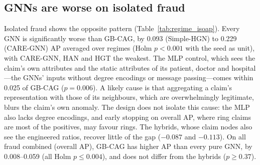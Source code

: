 \documentclass[pdflatex,sn-vancouver-num]{sn-jnl}
\begin{document}
\subsection{GNNs are worse on isolated fraud}
Isolated fraud shows the opposite pattern (Table~\ref{tab:regime_isoap}).
Every GNN is significantly worse than GB-CAG, by 0.093 (Simple-HGN) to 0.229
(CARE-GNN) AP averaged over regimes (Holm $p<0.001$ with the seed as unit),
with CARE-GNN, HAN and HGT the weakest. The MLP control, which sees the claim's own
attributes and the static attributes of its patient, doctor and
hospital---the GNNs' inputs without degree encodings or message
passing---comes within 0.025 of GB-CAG ($p=0.006$). A likely cause is that
aggregating a claim's representation with those of its neighbours, which are
overwhelmingly legitimate, blurs the claim's own anomaly. The design does not
isolate this cause: the MLP also lacks degree encodings, and early stopping on
overall AP, where ring claims are most of the positives, may favour rings. The
hybrids, whose claim nodes also see the engineered ratios, recover little of the gap ($-0.087$ and
$-0.113$). On all fraud combined (overall AP), GB-CAG has higher AP than
every pure GNN, by 0.008--0.059 (all Holm $p\le0.004$), and does not differ
from the hybrids ($p\ge0.37$).
\end{document}
